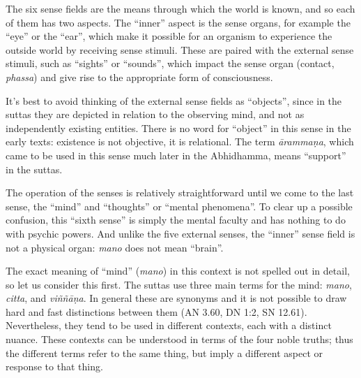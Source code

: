 \documentclass[12pt,openany]{book}%
\begin{document}
The six sense fields are the means through which the world is known, and so each of them has two aspects. The “inner” aspect is the sense organs, for example the “eye” or the “ear”, which make it possible for an organism to experience the outside world by receiving sense stimuli. These are paired with the external sense stimuli, such as “sights” or “sounds”, which impact the sense organ (contact, \textit{phassa}) and give rise to the appropriate form of consciousness.

It’s best to avoid thinking of the external sense fields as “objects”, since in the suttas they are depicted in relation to the observing mind, and not as independently existing entities. There is no word for “object” in this sense in the early texts: existence is not objective, it is relational. The term \textit{\textsanskrit{ārammaṇa}}, which came to be used in this sense much later in the Abhidhamma, means “support” in the suttas.

The operation of the senses is relatively straightforward until we come to the last sense, the “mind” and “thoughts” or “mental phenomena”. To clear up a possible confusion, this “sixth sense” is simply the mental faculty and has nothing to do with psychic powers. And unlike the five external senses, the “inner” sense field is not a physical organ: \textit{mano} does not mean “brain”.

The exact meaning of “mind” (\textit{mano}) in this context is not spelled out in detail, so let us consider this first. The suttas use three main terms for the mind: \textit{mano}, \textit{citta}, and \textit{\textsanskrit{viññāṇa}}. In general these are synonyms and it is not possible to draw hard and fast distinctions between them (AN 3.60, DN 1:2, SN 12.61). Nevertheless, they tend to be used in different contexts, each with a distinct nuance. These contexts can be understood in terms of the four noble truths; thus the different terms refer to the same thing, but imply a different aspect or response to that thing.
\end{document}
